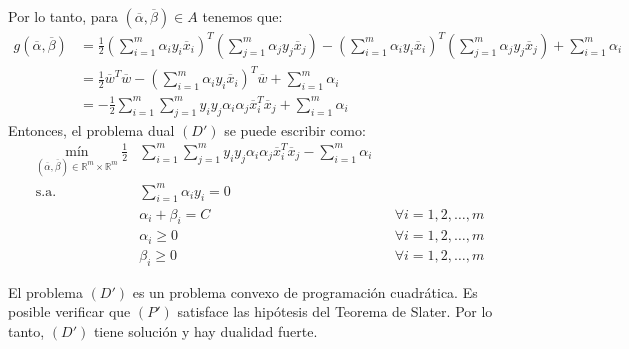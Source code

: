 \documentclass[11pt]{article}
\newcommand{\R}{\mathbb{R}}
\newcommand{\Rm}{\R^{m}}
\newcommand{\av}{\overline{\alpha}}
\newcommand{\bev}{\overline{\beta}}
\newcommand{\wv}{\overline{w}}
\newcommand{\x}{\overline{x}}
\newcommand{\Sm}{1,2,\ldots, m}
\newcommand{\ali}{\alpha_{i}}
\newcommand{\alj}{\alpha_{j}}
\newcommand{\bei}{\beta_{i}}
\begin{document}
Por lo tanto, para $(\av, \bev)\in A$ tenemos que:
\begin{equation*}
\begin{aligned}
g(\av, \bev)&=\frac{1}{2}\left(\sum_{i=1}^{m}\ali y_{i}\x_{i}\right)^{T}\left(\sum_{j=1}^{m}\alj y_{j}\x_{j}\right)-\left(\sum_{i=1}^{m}\ali y_{i}\x_{i}\right)^{T}\left(\sum_{j=1}^{m}\alj y_{j}\x_{j}\right)+\sum_{i=1}^{m}\ali\\
&=\frac{1}{2}\wv^{T}\wv-\left(\sum_{i=1}^{m}\ali y_{i}\x_{i}\right)^{T}\wv+\sum_{i=1}^{m}\ali\\
&=-\frac{1}{2}\sum_{i=1}^{m}\sum_{j=1}^{m}y_{i}y_{j}\ali\alj\x_{i}^{T}\x_{j}+\sum_{i=1}^{m}\ali
\end{aligned}
\end{equation*}
Entonces, el problema dual $(D')$ se puede escribir como:
\begin{equation*}
\begin{aligned}
\underset{(\av, \bev)\in\Rm\times\Rm}{\text{mín}}\ \frac{1}{2}&\sum_{i=1}^{m}\sum_{j=1}^{m}y_{i}y_{j}\ali\alj\x_{i}^{T}\x_{j}-\sum_{i=1}^{m}\ali \\
\text{s.a.}\ \
& \sum_{i=1}^{m}\ali y_{i}=0\\
& \ali+\bei=C &&\forall i=\Sm\\
& \ali\geq0 &&\forall i=\Sm\\
& \bei\geq0 &&\forall i=\Sm
\end{aligned}
\end{equation*}

El problema $(D')$ es un problema convexo de programación cuadrática. Es posible verificar que $(P')$ satisface las hipótesis del Teorema de Slater. Por lo tanto, $(D')$ tiene solución y hay dualidad fuerte.\\
\end{document}
